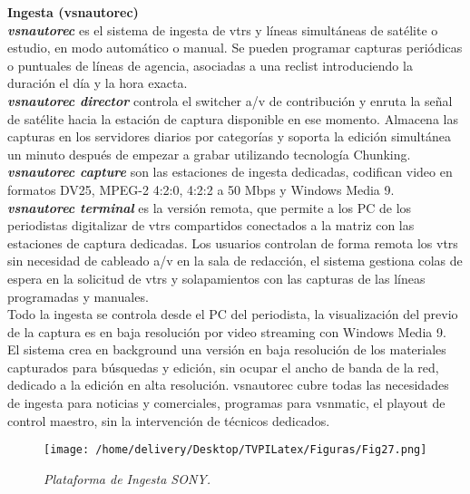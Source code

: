 \documentclass[a4paper,11pt]{article} %
\begin{document}
\newpage
\textbf{Ingesta (vsnautorec)} 
\\

\textbf{\emph{vsnautorec}} es el sistema de ingesta de vtrs y líneas
simultáneas de satélite o estudio, en modo automático o manual. Se
pueden programar capturas periódicas o puntuales de líneas de agencia,
asociadas a una reclist introduciendo la duración el día y la hora
exacta. 
\\

\textbf{\emph{vsnautorec director}} controla el switcher a/v de
contribución y enruta la señal de satélite hacia la estación de captura
disponible en ese momento. Almacena las capturas en los servidores
diarios por categorías y soporta la edición simultánea un minuto después
de empezar a grabar utilizando tecnología Chunking.
\\

\textbf{\emph{vsnautorec capture}} son las estaciones de ingesta
dedicadas, codifican video en formatos DV25, MPEG-2 4:2:0, 4:2:2 a 50
Mbps y Windows Media 9.
\\

\textbf{\emph{vsnautorec terminal}} es la versión remota, que permite a
los PC de los periodistas digitalizar de vtrs compartidos conectados a
la matriz con las estaciones de captura dedicadas. Los usuarios
controlan de forma remota los vtrs sin necesidad de cableado a/v en la
sala de redacción, el sistema gestiona colas de espera en la solicitud
de vtrs y solapamientos con las capturas de las líneas programadas y
manuales.
\\

Todo la ingesta se controla desde el PC del periodista, la visualización
del previo de la captura es en baja resolución por video streaming con
Windows Media 9.
\\

El sistema crea en background una versión en baja resolución de los
materiales capturados para búsquedas y edición, sin ocupar el ancho de
banda de la red, dedicado a la edición en alta resolución. vsnautorec
cubre todas las necesidades de ingesta para noticias y comerciales,
programas para vsnmatic, el playout de control maestro, sin la
intervención de técnicos dedicados.

\begin{figure}[h!] 
\centering
\texttt{[image: /home/delivery/Desktop/TVPILatex/Figuras/Fig27.png]}
\caption{\emph{Plataforma de Ingesta SONY.}}
\end{figure}
\end{document}
